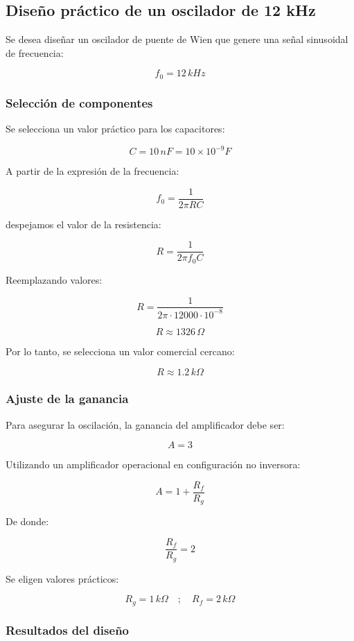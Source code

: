 \documentclass[12pt,a4paper]{article}
\begin{document}
\subsection{Diseño práctico de un oscilador de 12 kHz}

Se desea diseñar un oscilador de puente de Wien que genere una señal sinusoidal de frecuencia:

\[
f_0 = 12\,kHz
\]

\subsubsection{Selección de componentes}

Se selecciona un valor práctico para los capacitores:

\[
C = 10\,nF = 10 \times 10^{-9} F
\]

A partir de la expresión de la frecuencia:

\[
f_0 = \frac{1}{2\pi RC}
\]

despejamos el valor de la resistencia:

\[
R = \frac{1}{2\pi f_0 C}
\]

Reemplazando valores:

\[
R = \frac{1}{2\pi \cdot 12000 \cdot 10^{-8}}
\]

\[
R \approx 1326\,\Omega
\]

Por lo tanto, se selecciona un valor comercial cercano:

\[
R \approx 1.2\,k\Omega
\]

\subsubsection{Ajuste de la ganancia}

Para asegurar la oscilación, la ganancia del amplificador debe ser:

\[
A = 3
\]

Utilizando un amplificador operacional en configuración no inversora:

\[
A = 1 + \frac{R_f}{R_g}
\]

De donde:

\[
\frac{R_f}{R_g} = 2
\]

Se eligen valores prácticos:

\[
R_g = 1\,k\Omega \quad ; \quad R_f = 2\,k\Omega
\]

\subsubsection{Resultados del diseño}
\end{document}
